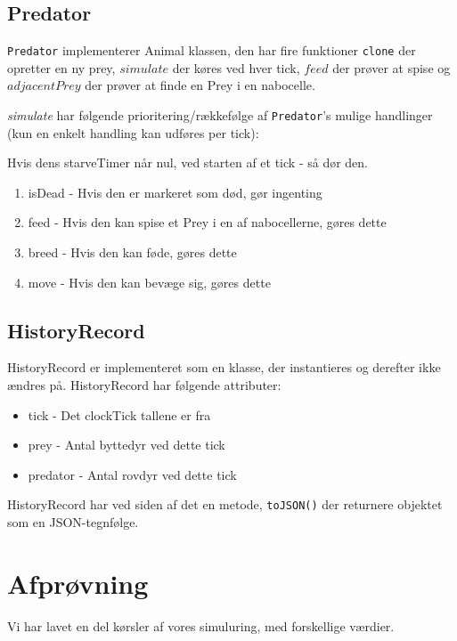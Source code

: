 \documentclass[a4paper]{article}
\begin{document}
    \subsection*{Predator}
      \texttt{Predator} implementerer Animal klassen,
      den har fire funktioner \lstinline$clone$ der opretter en ny prey,
      $simulate$ der køres ved hver tick, $feed$ der prøver at spise
      og $adjacentPrey$ der prøver at finde en Prey i en nabocelle.

      \textit{simulate} har følgende prioritering/rækkefølge af \texttt{Predator}'s mulige handlinger (kun en enkelt handling kan udføres per tick):

      Hvis dens starveTimer når nul, ved starten af et tick - så dør den.

      \begin{enumerate}
        \item isDead - Hvis den er markeret som død, gør ingenting
        \item feed - Hvis den kan spise et Prey i en af nabocellerne, gøres dette
        \item breed - Hvis den kan føde, gøres dette
        \item move - Hvis den kan bevæge sig, gøres dette
      \end{enumerate}
    
    \subsection*{HistoryRecord}
      HistoryRecord er implementeret som en klasse, der instantieres og derefter ikke ændres på.
      HistoryRecord har følgende attributer:
      \begin{itemize}
        \item tick - Det clockTick tallene er fra
        \item prey - Antal byttedyr ved dette tick
        \item predator - Antal rovdyr ved dette tick
      \end{itemize}
      HistoryRecord har ved siden af det en metode, \lstinline$toJSON()$ der returnere objektet som en JSON-tegnfølge.
      
  \section{Afprøvning} \label{sec:unitTest}

    Vi har lavet en del kørsler af vores simuluring,
    med forskellige værdier.
\end{document}
